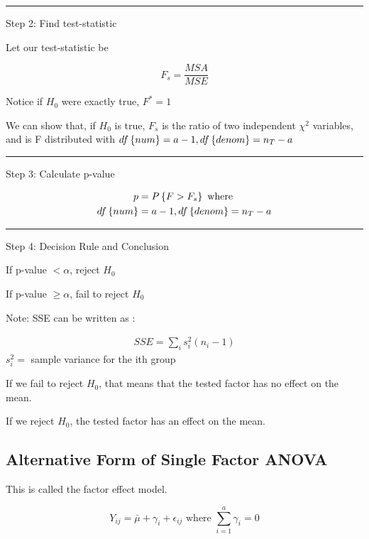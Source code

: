 \documentclass[10pt]{article}
\newcommand{\define}[1]{\colorbox{Thistle2}{#1}}
\newcommand{\emphas}[1]{\colorbox{DarkSeaGreen2}{#1}}
\newcommand{\svar}[1]{s^2_{#1}} %
\newcommand{\err}[1]{\epsilon_{#1}}
\newcommand{\prob}[1]{P\left\{#1\right\}}
\newcommand{\drawline}{\noindent\rule{\linewidth}{0.1pt}}
\begin{document}
\begin{multicols}{3}
    \drawline
    
    Step 2: Find \emphas{test-statistic}

    Let our test-statistic be 

    \begin{equation*}
        F_s = \frac{MSA}{MSE}
    \end{equation*}

    Notice if $H_0$ were exactly true, $F^* = 1$

    We can show that, if $H_0$ is true, $F_s$ is the ratio of two independent $\chi^2$ variables, and is F distributed with $df\left\{num\right\} = a-1, df\left\{denom\right\}=n_T-a$

    \drawline

    Step 3: Calculate \emphas{p-value}

    \begin{align*}
        p & = \prob{F > F_s} \text{ where}\\
        \df{num} & = a-1, \df{denom} = n_T - a
    \end{align*}

    \drawline

    Step 4: \emphas{Decision Rule and Conclusion}

    If p-value $< \alpha$, reject $H_0$

    If p-value $\geq \alpha$, fail to reject $H_0$

    Note: SSE can be written as :

    \begin{align*}
        SSE = \sum_i \svar{i} (n_i - 1)
    \end{align*}
    $\svar{i} =$ sample variance for the ith group

    If we fail to reject $H_0$, that means that the tested factor has no effect on the mean.

    If we reject $H_0$, the tested factor has an effect on the mean.

    \subsection{Alternative Form of Single Factor ANOVA}

    This is called the \define{factor effect model}.

    \begin{equation}
        Y_{ij} = \bar \mu + \gamma_i + \err{ij} \text{ where } \sum^a_{i=1} \gamma_i = 0
    \end{equation}


\end{multicols}
\end{document}
